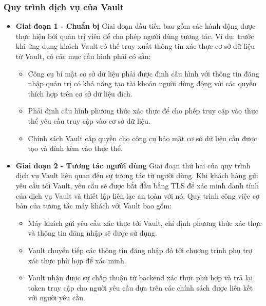 \documentclass[12pt,a4paper]{report}
\begin{document}
	\subsubsection{Quy trình dịch vụ của Vault}
	\hspace{1.0cm}{Có nhiều khía cạnh để chuẩn bị cho Vault xử lý các yêu cầu của khách hàng hàng ngày. Nói chung, có ba giai đoạn để chuẩn bị môi trường Vault sẵn sàng sản xuất: cấu hình, tương tác với máy khách và các sự kiện sau máy khách. Mỗi giai đoạn đều cần thiết để xây dựng một môi trường hoạt động Vault.}
	\begin{itemize}
		\item \textbf{Giai đoạn 1 - Chuẩn bị}
		\smallskip
		\subitem
		{Giai đoạn đầu tiên bao gồm các hành động được thực hiện bởi quản trị viên để cho phép người dùng tương tác. Ví dụ: trước khi ứng dụng khách Vault có thể truy xuất thông tin xác thực cơ sở dữ liệu từ Vault, có các mục cấu hình phải có sẵn:}
		\begin{itemize}
			\item
			{Công cụ bí mật cơ sở dữ liệu phải được định cấu hình với thông tin đăng nhập quản trị có khả năng tạo tài khoản người dùng động với các quyền thích hợp trên cơ sở dữ liệu đích.}
			\item
			{Phải định cấu hình phương thức xác thực để cho phép truy cập vào thực thể yêu cầu truy cập vào cơ sở dữ liệu.}
			\item
			{Chính sách Vault cấp quyền cho công cụ bảo mật cơ sở dữ liệu cần được tạo và đính kèm vào thực thể.}
		\end{itemize}
		\item \textbf{Giai đoạn 2 - Tương tác người dùng}
		\smallskip
		\subitem
		{Giai đoạn thứ hai của quy trình dịch vụ Vault liên quan đến sự tương tác từ người dùng. Khi khách hàng gửi yêu cầu tới Vault, yêu cầu sẽ được bắt đầu bằng TLS để xác minh danh tính của dịch vụ Vault và thiết lập liên lạc an toàn với nó. Quy trình công việc cơ bản của tương tác máy khách với Vault bao gồm:}
		\begin{itemize}
			\item {Máy khách gửi yêu cầu xác thực tới Vault, chỉ định phương thức xác thực và thông tin đăng nhập sẽ được sử dụng.}
			\item {Vault chuyển tiếp các thông tin đăng nhập đó tới chương trình phụ trợ xác thực phù hợp để xác minh.}
			\item {Vault nhận được sự chấp thuận từ backend xác thực phù hợp và trả lại token truy cập cho người yêu cầu dựa trên các chính sách được liên kết với người yêu cầu.}

\end{itemize}
\end{itemize}
\end{document}
